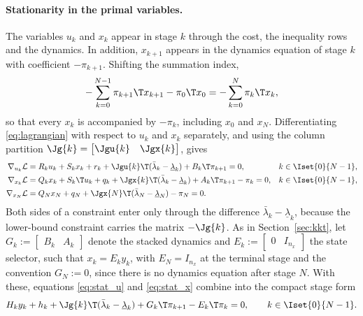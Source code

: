 \paragraph{Stationarity in the primal variables.}
The variables $u_k$ and $x_k$ appear in stage $k$ through the cost, the inequality rows and the dynamics.
In addition, $x_{k+1}$ appears in the dynamics equation of stage $k$ with coefficient $-\pi_{k+1}$.
Shifting the summation index,
\[
    -\sum_{k=0}^{N-1}\pi_{k+1}\T x_{k+1} - \pi_0\T x_0 = -\sum_{k=0}^{N}\pi_k\T x_k ,
\]
so that every $x_k$ is accompanied by $-\pi_k$, including $x_0$ and $x_N$.
Differentiating \eqref{eq:lagrangian} with respect to $u_k$ and $x_k$ separately, and using the column partition $\Jg{k} = \begin{bmatrix} \Jgu{k} & \Jgx{k} \end{bmatrix}$, gives
\begin{align}
    \nabla_{u_k}\mathcal{L} &= R_k u_k + S_k x_k + r_k + \Jgu{k}\T(\bar{\lambda}_k - \underline{\lambda}_k) + B_k\T \pi_{k+1} = 0, && k\in\Iset{0}{N-1}, \label{eq:stat_u}\\
    \nabla_{x_k}\mathcal{L} &= Q_k x_k + S_k\T u_k + q_k + \Jgx{k}\T(\bar{\lambda}_k - \underline{\lambda}_k) + A_k\T \pi_{k+1} - \pi_k = 0, && k\in\Iset{0}{N-1}, \label{eq:stat_x}\\
    \nabla_{x_N}\mathcal{L} &= Q_N x_N + q_N + \Jgx{N}\T(\bar{\lambda}_N - \underline{\lambda}_N) - \pi_N = 0. && \label{eq:stat_x_N}
\end{align}
Both sides of a constraint enter only through the difference $\bar{\lambda}_k - \underline{\lambda}_k$, because the lower-bound constraint carries the matrix $-\Jg{k}$.
As in Section~\ref{sec:kkt}, let $G_k := \begin{bmatrix} B_k & A_k \end{bmatrix}$ denote the stacked dynamics and $E_k := \begin{bmatrix} 0 & I_{n_x} \end{bmatrix}$ the state selector, such that $x_k = E_k y_k$, with $E_N = I_{n_x}$ at the terminal stage and the convention $G_N := 0$, since there is no dynamics equation after stage $N$.
With these, equations \eqref{eq:stat_u} and \eqref{eq:stat_x} combine into the compact stage form
\begin{equation} \label{eq:stat_y}
    H_k y_k + h_k + \Jg{k}\T(\bar{\lambda}_k - \underline{\lambda}_k) + G_k\T \pi_{k+1} - E_k\T \pi_k = 0 , \qquad k\in\Iset{0}{N-1} .
\end{equation}

